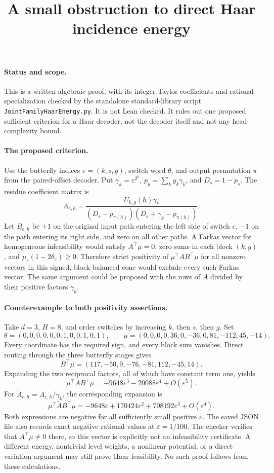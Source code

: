 \documentclass{article}
\begin{document}
\title{A small obstruction to direct Haar incidence energy}
\maketitle
\paragraph{Status and scope.}
This is a written algebraic proof, with its integer Taylor coefficients
and rational specialization checked by the standalone standard-library
script \texttt{JointFamilyHaarEnergy.py}.  It is not Lean checked.  It
rules out one proposed sufficient criterion for a Haar decoder, not the
decoder itself and not any head-complexity bound.

\paragraph{The proposed criterion.}
Use the butterfly indices $e=(k,s,g)$, switch word $\theta$, and output
permutation $\pi$ from the paired-offset decoder.  Put
$\gamma_k=\varepsilon^{2^k}$, $p_y=\sum_k y_k\gamma_k$, and $D_s=1-p_s$.
The residue coefficient matrix is
\[
 A_{e,h}=\frac{U_{k,g}(h)\gamma_k}
 {(D_s-p_{\pi(h)})(D_s+\gamma_k-p_{\pi(h)})}.
\]
Let $B_{e,h}$ be $+1$ on the original input path entering the left side
of switch $e$, $-1$ on the path entering its right side, and zero on all
other paths.  A Farkas vector for homogeneous infeasibility would satisfy
$A^\top\mu=0$, zero sums in each block $(k,g)$, and
$\mu_e(1-2\theta_e)\geq0$.  Therefore strict positivity of
$\mu^\top A B^\top\mu$ for all nonzero vectors in this signed, block-balanced
cone would exclude every such Farkas vector.  The same argument could
be proposed with the rows of $A$ divided by their positive factors
$\gamma_k$.

\paragraph{Counterexample to both positivity assertions.}
Take $d=3$, $H=8$, and order switches by increasing $k$, then $s$, then $g$.
Set
\[
 \theta=(0,0,0,0,0,0,1,0,0,1,0,1),\qquad
 \mu=(0,0,0,0,36,0,-36,0,81,-112,45,-14).
\]
Every coordinate has the required sign, and every block sum vanishes.
Direct routing through the three butterfly stages gives
\[
 B^\top\mu=(117,-50,9,-76,-81,112,-45,14).
\]
Expanding the two reciprocal factors, all of which have constant term
one, yields
\[
 \mu^\top A B^\top\mu=-9648\varepsilon^3-20088\varepsilon^4
 +O(\varepsilon^5).
\]
For $\widetilde A_{e,h}=A_{e,h}/\gamma_k$, the corresponding expansion is
\[
 \mu^\top\widetilde A B^\top\mu=-9648\varepsilon
 +170424\varepsilon^2+708192\varepsilon^3+O(\varepsilon^4).
\]
Both expressions are negative for all sufficiently small positive
$\varepsilon$.  The saved JSON file also records exact negative rational
values at $\varepsilon=1/100$.  The checker verifies that
$A^\top\mu\neq0$ there, so this vector is explicitly not an infeasibility
certificate.  A different energy, nontrivial level weights, a nonlinear
potential, or a direct variation argument may still prove Haar
feasibility.  No such proof follows from these calculations.
\end{document}
